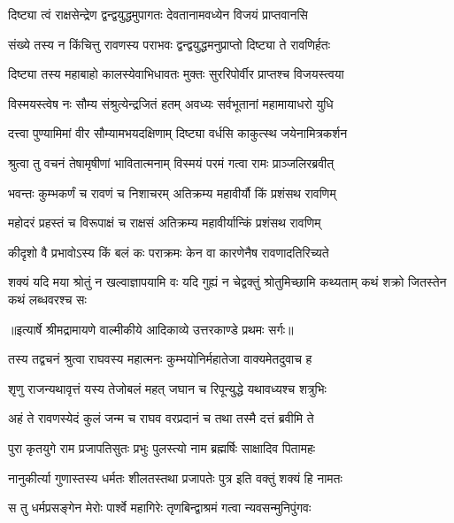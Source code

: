 \twolineshloka
{दिष्ट्या त्वं राक्षसेन्द्रेण द्वन्द्वयुद्धमुपागतः}
{देवतानामवध्येन विजयं प्राप्तवानसि} %

\twolineshloka
{संख्ये तस्य न किंचित्तु रावणस्य पराभवः}
{द्वन्द्वयुद्धमनुप्राप्तो दिष्ट्या ते रावणिर्हतः} %

\twolineshloka
{दिष्ट्या तस्य महाबाहो कालस्येवाभिधावतः}
{मुक्तः सुररिपोर्वीर प्राप्तश्च विजयस्त्वया} %

\twolineshloka
{विस्मयस्त्वेष नः सौम्य संश्रुत्येन्द्रजितं हतम्}
{अवध्यः सर्वभूतानां महामायाधरो युधि} %

\twolineshloka
{दत्त्वा पुण्यामिमां वीर सौम्यामभयदक्षिणाम्}
{दिष्ट्या वर्धसि काकुत्स्थ जयेनामित्रकर्शन} %

\twolineshloka
{श्रुत्वा तु वचनं तेषामृषीणां भावितात्मनाम्}
{विस्मयं परमं गत्वा रामः प्राञ्जलिरब्रवीत्} %

\twolineshloka
{भवन्तः कुम्भकर्णं च रावणं च निशाचरम्}
{अतिक्रम्य महावीर्यौ किं प्रशंसथ रावणिम्} %

\twolineshloka
{महोदरं प्रहस्तं च विरूपाक्षं च राक्षसं}
{अतिक्रम्य महावीर्यान्किं प्रशंसथ रावणिम्} %

\twolineshloka
{कीदृशो वै प्रभावोऽस्य किं बलं कः पराक्रमः}
{केन वा कारणेनैष रावणादतिरिच्यते} %

\threelineshloka
{शक्यं यदि मया श्रोतुं न खल्वाज्ञापयामि वः}
{यदि गुह्यं न चेद्वक्तुं श्रोतुमिच्छामि कथ्यताम्}
{कथं शक्रो जितस्तेन कथं लब्धवरश्च सः} %


{॥इत्यार्षे श्रीमद्रामायणे वाल्मीकीये आदिकाव्ये उत्तरकाण्डे प्रथमः सर्गः॥}


\twolineshloka
{तस्य तद्वचनं श्रुत्वा राघवस्य महात्मनः}
{कुम्भयोनिर्महातेजा वाक्यमेतदुवाच ह} %

\twolineshloka
{शृणु राजन्यथावृत्तं यस्य तेजोबलं महत्}
{जघान च रिपून्युद्धे यथावध्यश्च शत्रुभिः} %

\twolineshloka
{अहं ते रावणस्येदं कुलं जन्म च राघव}
{वरप्रदानं च तथा तस्मै दत्तं ब्रवीमि ते} %

\twolineshloka
{पुरा कृतयुगे राम प्रजापतिसुतः प्रभुः}
{पुलस्त्यो नाम ब्रह्मर्षिः साक्षादिव पितामहः} %

\twolineshloka
{नानुकीर्त्या गुणास्तस्य धर्मतः शीलतस्तथा}
{प्रजापतेः पुत्र इति वक्तुं शक्यं हि नामतः} %

\twolineshloka
{स तु धर्मप्रसङ्गेन मेरोः पार्श्वे महागिरेः}
{तृणबिन्द्वाश्रमं गत्वा न्यवसन्मुनिपुंगवः} %

